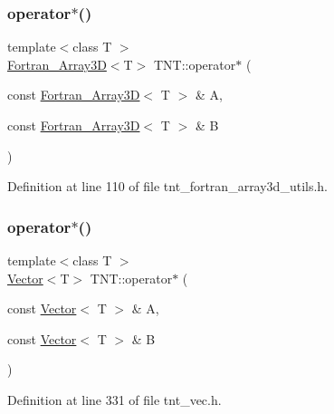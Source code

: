 \mbox{\label{namespaceTNT_a0463d6c8ceb6ba5fe8217a0482ae7d90}} 
\subsubsection{\texorpdfstring{operator$\ast$()}{operator*()}\hspace{0.1cm}{\footnotesize\ttfamily [5/8]}}
{\footnotesize\ttfamily template$<$class T $>$ \\
\hyperlink{classTNT_1_1Fortran__Array3D}{Fortran\+\_\+\+Array3D}$<$T$>$ T\+N\+T\+::operator$\ast$ (\begin{DoxyParamCaption}\item[{const \hyperlink{classTNT_1_1Fortran__Array3D}{Fortran\+\_\+\+Array3D}$<$ T $>$ \&}]{A,  }\item[{const \hyperlink{classTNT_1_1Fortran__Array3D}{Fortran\+\_\+\+Array3D}$<$ T $>$ \&}]{B }\end{DoxyParamCaption})}



Definition at line 110 of file tnt\+\_\+fortran\+\_\+array3d\+\_\+utils.\+h.

\mbox{\label{namespaceTNT_a6a759501941fd46aa222319403fedfc4}} 
\subsubsection{\texorpdfstring{operator$\ast$()}{operator*()}\hspace{0.1cm}{\footnotesize\ttfamily [6/8]}}
{\footnotesize\ttfamily template$<$class T $>$ \\
\hyperlink{classTNT_1_1Vector}{Vector}$<$T$>$ T\+N\+T\+::operator$\ast$ (\begin{DoxyParamCaption}\item[{const \hyperlink{classTNT_1_1Vector}{Vector}$<$ T $>$ \&}]{A,  }\item[{const \hyperlink{classTNT_1_1Vector}{Vector}$<$ T $>$ \&}]{B }\end{DoxyParamCaption})}



Definition at line 331 of file tnt\+\_\+vec.\+h.

\mbox{\label{namespaceTNT_a3f2fe841addf8cfa323c26ad9d50f010}} 
